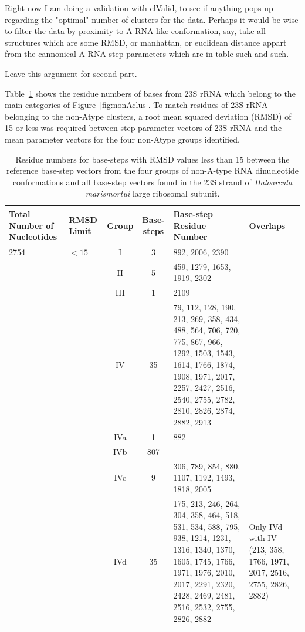Right now I am doing a validation with clValid, to see if anything
pops up regarding the "optimal" number of clusters for the data.
Perhaps it would be wise to filter the data by proximity to A-RNA like
conformation, say, take all structures which are some RMSD, or
manhattan, or euclidean distance appart from the cannonical A-RNA step
parameters which are in table such and such.

Leave this argument for second part.



Table~\ref{tab:nonA}  shows  the
residue  numbers of  bases  from 23S  rRNA  which belong  to the  main
categories of Figure~\ref{fig:nonAclus}.   To match residues of
23S  rRNA belonging  to the  non-Atype  clusters, a  root mean  squared
deviation (RMSD)  of 15  or less was  required between  step parameter
vectors  of 23S  rRNA  and the  mean  parameter vectors  for the  four
non-Atype groups identified.
\begin{table}[htbp]
\begin{center}
{\footnotesize
\begin{tabular}{p{3cm}|p{}|c|c|p{3cm}|p{3cm}}
\hline
\bf{Total Number of Nucleotides} & \bf{RMSD Limit} & \bf{Group}
& \bf{Base-steps} & \bf{Base-step Residue Number}
& \bf{Overlaps} \\ \hline
2754 & $ < 15$ & I & 3 & 892, 2006, 2390 &  \\ \hline
 &  & II & 5 & 459, 1279, 1653, 1919, 2302 &  \\ \hline
 &  & III & 1 & 2109 &  \\ \hline
 &  & IV & 35 & 79, 112, 128, 190, 213, 269, 358, 434, 488, 564, 706,
 720, 775, 867, 966, 1292, 1503, 1543, 1614, 1766, 1874, 1908,
 1971, 2017, 2257, 2427, 2516, 2540, 2755, 2782, 2810, 2826,
 2874, 2882, 2913 &  \\ \hline
 &  & IVa & 1 & 882 &  \\ \hline
 &  & IVb & 807 &  &  \\ \hline
 &  & IVc & 9 & 306, 789, 854, 880, 1107, 1192, 1493, 1818, 2005 &  \\ \hline
 &  & IVd & 35 & 175, 213, 246, 264, 304, 358, 464, 518, 531, 534,
 588, 795, 938, 1214, 1231, 1316, 1340, 1370, 1605, 1745, 1766, 
 1971, 1976, 2010, 2017, 2291, 2320, 2428, 2469, 2481, 2516, 2532, 
 2755, 2826, 2882 & Only IVd with IV (213, 358, 1766, 1971, 2017, 
 2516, 2755, 2826, 2882) \\ \hline
\end{tabular}
}
\caption{Residue numbers for base-steps  with RMSD values less than 15
between  the  reference base-step  vectors  from  the  four groups  of
non-A-type  RNA dinucleotide conformations  and all  base-step vectors
found  in  the 23S  strand  of  \textit{Haloarcula marismortui}  large
ribosomal subunit.}
\label{tab:nonA}
\end{center}
\end{table}



